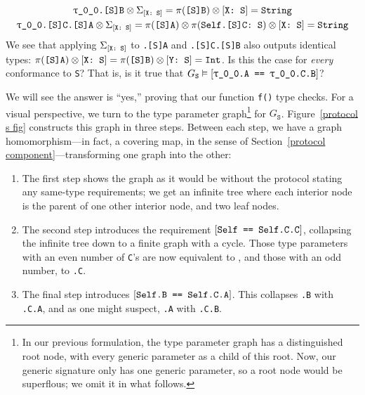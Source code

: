 \documentclass[../generics]{subfiles}
\begin{document}
\begin{example}
\begin{gather*}
\texttt{\texttt{$\uptau$\_0\_0}.[S]B}\otimes\Sigma_{[\texttt{X:~S}]}=\pi(\texttt{[S]B})\otimes[\texttt{X:~S}]=\texttt{String}\\
\texttt{\texttt{$\uptau$\_0\_0}.[S]C.[S]A}\otimes\Sigma_{[\texttt{X:~S}]}=\pi(\texttt{[S]A})\otimes\pi(\texttt{Self.[S]C:~S})\otimes[\texttt{X:~S}]=\texttt{String}
\end{gather*}
We see that applying $\Sigma_{[\texttt{X:~S}]}$ to \texttt{.[S]A} and \texttt{.[S]C.[S]B} also outputs identical types: $\pi(\texttt{[S]A})\otimes[\texttt{X:~S}]=\pi(\texttt{[S]B})\otimes[\texttt{Y:~S}]=\texttt{Int}$. Is this the case for \emph{every} conformance to \texttt{S}? That is, is it true that $G_\texttt{S}\vDash[\texttt{\texttt{\texttt{$\uptau$\_0\_0}.A} == \texttt{\texttt{$\uptau$\_0\_0}.C.B}}]$?

We will see the answer is ``yes,'' proving that our function \texttt{f()} type checks. For a visual perspective, we turn to the type parameter graph\footnote{In our previous formulation, the type parameter graph has a distinguished root node, with every generic parameter as a child of this root. Now, our generic signature only has one generic parameter, so a root node would be superflous; we omit it in what follows.} for $G_\texttt{S}$. Figure~\ref{protocol s fig} constructs this graph in three steps. Between each step, we have a graph homomorphism---in fact, a covering map, in the sense of Section~\ref{protocol component}---transforming one graph into the other:
\begin{enumerate}
\item The first step shows the graph as it would be without the protocol stating any same-type requirements; we get an infinite tree where each interior node is the parent of one other interior node, and two leaf nodes.

\item The second step introduces the requirement $[\texttt{Self == Self.C.C}]$, collapsing the infinite tree down to a finite graph with a cycle. Those type parameters with an even number of \texttt{C}'s are now equivalent to \texttt{}, and those with an odd number, to \texttt{.C}.

\item The final step introduces $[\texttt{Self.B == Self.C.A}]$. This collapses \texttt{.B} with \texttt{.C.A}, and as one might suspect, \texttt{.A} with \texttt{.C.B}.
\end{enumerate}


\end{example}
\end{document}
